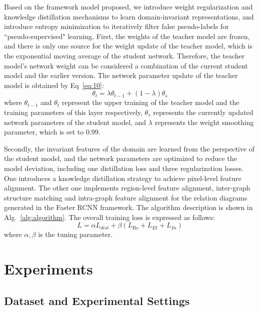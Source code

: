 \documentclass[sn-mathphys]{sn-jnl}%
\theoremstyle{thmstyleone}%
\theoremstyle{thmstyletwo}%
\theoremstyle{thmstylethree}%
\begin{document}
Based on the framework model proposed, we introduce weight regularization and knowledge distillation mechanisms to learn domain-invariant representations, and introduce entropy minimization to iteratively filter false pseudo-labels for ``pseudo-supervised" learning. First, the weights of the teacher model are frozen, and there is only one source for the weight update of the teacher model, which is the exponential moving average of the student network. Therefore, the teacher model's network weight can be considered a combination of the current student model and the earlier version. The network parameter update of the teacher model is obtained by Eq~\ref{eq:10}:
\begin{equation}
{{\theta }_{t}}=\lambda {{\theta }_{t-1}}+\left( 1-\lambda  \right){{\theta }_{s}}
\label{eq:10}
\end{equation}
where ${{\theta }_{t-1}}$ and ${{\theta }_{t}}$ represent the upper training of the teacher model and the training parameters of this layer respectively, ${{\theta }_{s}}$ represents the currently updated network parameters of the student model, and $\lambda$ represents the weight smoothing parameter, which is set to 0.99.	

Secondly, the invariant features of the domain are learned from the perspective of the student model, and the network parameters are optimized to reduce the model deviation, including one distillation loss and three regularization losses. One introduces a knowledge distillation strategy to achieve pixel-level feature alignment. The other one implements region-level feature alignment, inter-graph structure matching and intra-graph feature alignment for the relation diagrams generated in the Faster RCNN framework. The algorithm description is shown in Alg.~\ref{alg:algorithm}. The overall training loss is expressed as follows:
\begin{equation}
L=\alpha {{L}_{dist}}+\beta \left( {{L}_{\operatorname{Re}}}+{{L}_{Et}}+{{L}_{In}} \right)
\label{eq:11}
\end{equation}
where $\alpha ,\beta$ is the tuning parameter.


%
%
\section{Experiments}\label{sec:sec4}
\subsection{Dataset and Experimental Settings}
\end{document}
